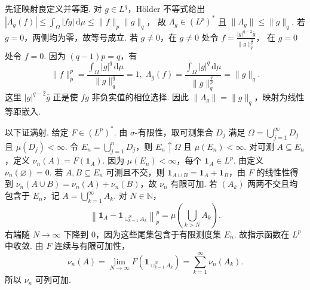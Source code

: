 \begin{FAProof}
先证映射良定义并等距. 对 \(\displaystyle g\in L^q\)，Hölder 不等式给出 \(\displaystyle |\Lambda_g(f)| \leqslant\int_\Omega|fg|\,\mathrm{d}\mu \leqslant\|f\|_p\|g\|_q\)，
故 \(\displaystyle \Lambda_g\in(L^p)^*\) 且 \(\displaystyle \|\Lambda_g\|\leqslant\|g\|_q\). 若 \(\displaystyle g=0\)，两侧均为零，故等号成立. 若 \(\displaystyle g\neq0\)，在 \(\displaystyle g\neq0\) 处令 \(\displaystyle f=\frac{|g|^{q-2}\overline g}{\|g\|_q^{\frac{q}{p}}}\)，
在 \(\displaystyle g=0\) 处令 \(\displaystyle f=0\). 因为 \(\displaystyle (q-1)p=q\)，有
\[
\|f\|_p^p
=\frac{\int_\Omega|g|^q\,\mathrm{d}\mu}{\|g\|_q^q}
=1,
\;
\Lambda_g(f)
=\frac{\int_\Omega|g|^q\,\mathrm{d}\mu}{\|g\|_q^{\frac{q}{p}}}
=\|g\|_q.
\]
这里 \(\displaystyle |g|^{q-2}\overline g\) 正是使 \(\displaystyle fg\) 非负实值的相位选择. 因此 \(\displaystyle \|\Lambda_g\|=\|g\|_q\)，映射为线性等距嵌入.

以下证满射. 给定 \(\displaystyle F\in(L^p)^*\). 由 \(\displaystyle \sigma\)-有限性，取可测集合 \(\displaystyle D_j\) 满足 \(\displaystyle \Omega=\bigcup_{j=1}^{\infty}D_j\) 且 \(\displaystyle \mu(D_j)<\infty\). 令 \(\displaystyle E_n=\bigcup_{j=1}^nD_j\)，则 \(\displaystyle E_n\uparrow\Omega\) 且 \(\displaystyle \mu(E_n)<\infty\). 对可测 \(\displaystyle A\subseteq E_n\)，定义 \(\displaystyle \nu_n(A)=F(\mathbf1_A)\).
因为 \(\displaystyle \mu(E_n)<\infty\)，每个 \(\displaystyle \mathbf1_A\in L^p\). 由定义 \(\displaystyle \nu_n(\varnothing)=0\). 若 \(\displaystyle A,B\subseteq E_n\) 可测且不交，则 \(\displaystyle \mathbf1_{A\cup B}=\mathbf1_A+\mathbf1_B\)，由 \(\displaystyle F\) 的线性性得到 \(\displaystyle \nu_n(A\cup B)=\nu_n(A)+\nu_n(B)\)，故 \(\displaystyle \nu_n\) 有限可加. 若 \(\displaystyle (A_k)\) 两两不交且均包含于 \(\displaystyle E_n\)，记 \(\displaystyle A=\bigcup_{k=1}^{\infty}A_k\). 对 \(\displaystyle N\in\mathbb N\)，
\[
\left\|\mathbf1_A-\mathbf1_{\cup_{k=1}^NA_k}\right\|_p^p
=\mu\!\left(\bigcup_{k>N}A_k\right).
\]
右端随 \(\displaystyle N\to\infty\) 下降到 \(\displaystyle0\)，因为这些尾集包含于有限测度集 \(\displaystyle E_n\). 故指示函数在 \(\displaystyle L^p\) 中收敛. 由 \(\displaystyle F\) 连续与有限可加性，
\[
\nu_n(A)
=\lim_{N\to\infty}F\!\left(\mathbf1_{\cup_{k=1}^NA_k}\right)
=\sum_{k=1}^{\infty}\nu_n(A_k).
\]
所以 \(\displaystyle \nu_n\) 可列可加.


\end{FAProof}
